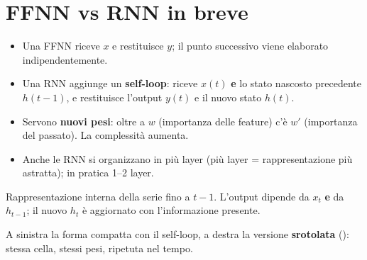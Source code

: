 \section{FFNN vs RNN in breve}
\begin{itemize}
  \item Una FFNN riceve $x$ e restituisce $y$; il punto successivo viene elaborato indipendentemente.
  \item Una RNN aggiunge un \textbf{self-loop}: riceve $x(t)$ \textbf{e} lo stato nascosto precedente $h(t-1)$, e restituisce
        l'output $y(t)$ e il nuovo stato $h(t)$.
  \item Servono \textbf{nuovi pesi}: oltre a $w$ (importanza delle feature) c'è $w'$ (importanza del passato).
        La complessità aumenta.
  \item Anche le RNN si organizzano in più layer (più layer = rappresentazione più astratta); in pratica 1--2 layer.
\end{itemize}
\begin{definizione}
Rappresentazione interna della serie fino a $t-1$. L'output dipende da $x_t$ \textbf{e} da $h_{t-1}$; il nuovo $h_t$
è aggiornato con l'informazione presente.
\end{definizione}

\begin{center}
\end{center}
A sinistra la forma compatta con il self-loop, a destra la versione \textbf{srotolata} (): stessa cella, stessi
pesi, ripetuta nel tempo.

